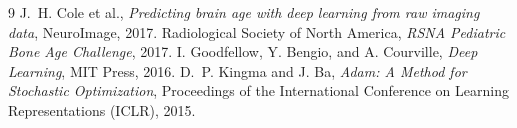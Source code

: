 \documentclass{article}
\begin{document}
\begin{thebibliography}{9}
J.~H. Cole et al.,
\emph{Predicting brain age with deep learning from raw imaging data}, NeuroImage, 2017.
Radiological Society of North America,
\emph{RSNA Pediatric Bone Age Challenge}, 2017.
I. Goodfellow, Y. Bengio, and A. Courville,
\emph{Deep Learning},
MIT Press, 2016.
D.~P. Kingma and J. Ba,
\emph{Adam: A Method for Stochastic Optimization},
Proceedings of the International Conference on Learning Representations (ICLR), 2015.
\end{thebibliography}
\end{document}
